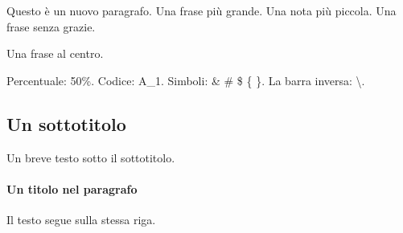 \documentclass[a4paper,11pt]{article} %
\begin{document}
Questo è un nuovo paragrafo. %
{\large Una frase più grande.} %
{\small Una nota più piccola.} %
{\sffamily Una frase senza grazie.} %
\begin{center} %
Una frase al centro. %
\end{center} %
Percentuale: 50\%. Codice: A\_1. Simboli: \& \# \$ \{ \}. %
La barra inversa: \textbackslash{}. %
\subsection{Un sottotitolo} %
Un breve testo sotto il sottotitolo. %
\paragraph{Un titolo nel paragrafo} %
Il testo segue sulla stessa riga. %
\end{document}
